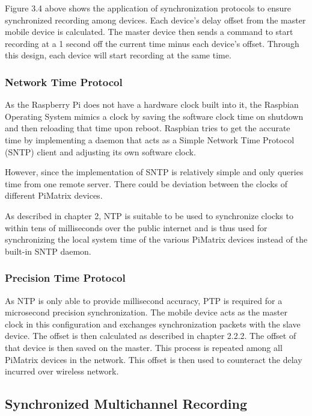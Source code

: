 \documentclass[hidelinks,12pt]{report} %
\begin{document}
Figure 3.4 above shows the application of synchronization protocols to ensure synchronized recording among devices. Each device’s delay offset from the master mobile device is calculated. The master device then sends a command to start recording at a 1 second off the current time minus each device’s offset. Through this design, each device will start recording at the same time.

\subsubsection{Network Time Protocol}

As the Raspberry Pi does not have a hardware clock built into it, the Raspbian Operating System mimics a clock by saving the software clock time on shutdown and then reloading that time upon reboot. Raspbian tries to get the accurate time by implementing a daemon that acts as a Simple Network Time Protocol (SNTP) client and adjusting its own software clock\cite{28}. 

However, since the implementation of SNTP is relatively simple and only queries time from one remote server. There could be deviation between the clocks of different PiMatrix devices. 

As described in chapter 2, NTP is suitable to be used to synchronize clocks to within tens of milliseconds over the public internet and is thus used for synchronizing the local system time of the various PiMatrix devices instead of the built-in SNTP daemon\cite{14}. 

\subsubsection{Precision Time Protocol}

As NTP is only able to provide millisecond accuracy, PTP is required for a microsecond precision synchronization. The mobile device acts as the master clock in this configuration and exchanges synchronization packets with the slave device. The offset is then calculated as described in chapter 2.2.2. The offset of that device is then saved on the master. This process is repeated among all PiMatrix devices in the network. This offset is then used to counteract the delay incurred over wireless network.

\subsection{Synchronized Multichannel Recording}
\end{document}
